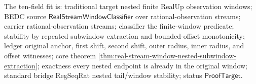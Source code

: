 The ten-field fit is: traditional target nested finite RealUp observation
windows; BEDC source $\mathsf{RealStreamWindowClassifier}$ over
rational-observation streams; carrier rational-observation streams; classifier
the finite-window predicate; stability by repeated subwindow extraction and
bounded-offset monotonicity; ledger original anchor, first shift, second shift,
outer radius, inner radius, and offset witnesses; core theorem
\autoref{thm:real-stream-window-nested-subwindow-extraction}; exactness every
nested endpoint is already in the original window; standard bridge RegSeqRat
nested tail/window stability; status $\mathsf{ProofTarget}$.
